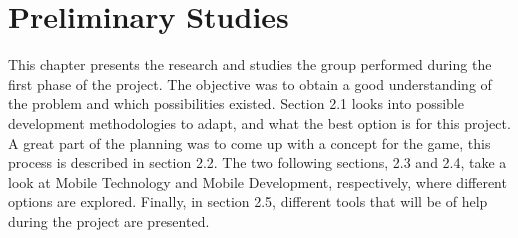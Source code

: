 \chapter{Preliminary Studies}
\label{chap:prestudies}

This chapter presents the research and studies the group performed during the first phase of 
the project. The objective was to obtain a good understanding of the problem and which 
possibilities existed. Section 2.1 looks into possible development methodologies to 
adapt, and what the best option is for this project. A great part of the planning was to 
come up with a concept for the game, this process is described in section 2.2. The two following 
sections, 2.3 and 2.4, take a look at Mobile Technology and Mobile Development, respectively, where different 
options are explored. Finally, in section 2.5, different tools that will be of help during the 
project are presented.